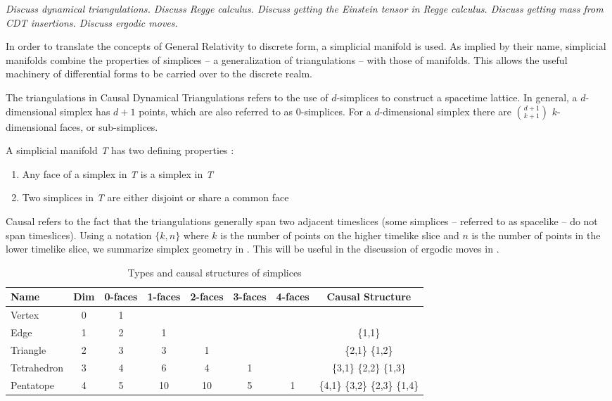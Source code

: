 \documentclass[12pt]{article}
\begin{document}
\textit{Discuss dynamical triangulations. Discuss Regge calculus. Discuss getting the Einstein tensor in Regge calculus. Discuss getting mass from CDT insertions. Discuss ergodic moves.}

In order to translate the concepts of General Relativity to discrete form, a simplicial manifold is used. As implied by their name, simplicial manifolds combine the properties of simplices -- a generalization of triangulations -- with those of manifolds. This allows the useful machinery of differential forms to be carried over to the discrete realm.

The triangulations in Causal Dynamical Triangulations refers to the use of $d$-simplices to construct a spacetime lattice. In general, a $d$-dimensional simplex has $d+1$ points, which are also referred to as $0$-simplices. For a $d$-dimensional simplex there are $\binom{d+1}{k+1}$ $k$-dimensional faces, or sub-simplices.

A simplicial manifold \textit{T} has two defining properties \cite{cgal:eb-12b}:

\begin{enumerate}
  \item Any face of a simplex in \textit{T} is a simplex in \textit{T}
  \item Two simplices in \textit{T} are either disjoint or share a common face
\end{enumerate}

Causal refers to the fact that the triangulations generally span two adjacent timeslices (some simplices -- referred to as spacelike -- do not span timeslices). Using a notation $\{k,n\}$ where $k$ is the number of points on the higher timelike slice and $n$ is the number of points in the lower timelike slice, we summarize simplex geometry in . This will be useful in the discussion of ergodic moves in .

\begin{table}
\centering
\begin{tabular}{|l|c|c|c|c|c|c|c|}
\hline
Name & Dim & 0-faces & 1-faces & 2-faces & 3-faces & 4-faces & Causal Structure \\
\hline
\hline
Vertex & 0 & 1 & & & & & \\
Edge & 1 & 2 & 1 & & & & \{1,1\} \\
Triangle & 2 & 3 & 3 & 1 & & & \{2,1\} \{1,2\}\\
Tetrahedron & 3 & 4 & 6 & 4 & 1 & & \{3,1\} \{2,2\} \{1,3\} \\
Pentatope & 4 & 5 & 10 & 10 & 5 & 1 & \{4,1\} \{3,2\} \{2,3\} \{1,4\} \\
\hline
\end{tabular}
\caption[Simplex types]{Types and causal structures of simplices}
\label{table:simplices}
\end{table}
\end{document}
